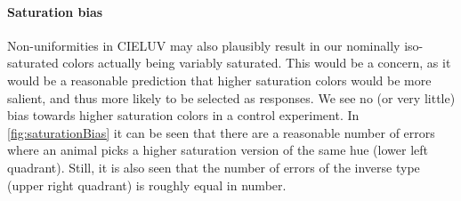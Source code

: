 \paragraph{Saturation bias}

\begin{center}
    
    \label{fig:saturationBias}
\end{center}

Non-uniformities in CIELUV may also plausibly result in our nominally iso-saturated colors actually being variably saturated. This would be a concern, as it would be a reasonable prediction that higher saturation colors would be more salient, and thus more likely to be selected as responses. We see no (or very little) bias towards higher saturation colors in a control experiment. In \autoref{fig:saturationBias} it can be seen that there are a reasonable number of errors where an animal picks a higher saturation version of the same hue (lower left quadrant). Still, it is also seen that the number of errors of the inverse type (upper right quadrant) is roughly equal in number.

